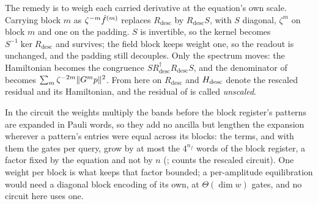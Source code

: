 The remedy is to weigh each carried derivative at the equation's own scale. Carrying block $m$ as $\zeta^{-m}\hat{f}^{(m)}$ replaces $R_{\mathrm{desc}}$ by $R_{\mathrm{desc}}S$, with $S$ diagonal, $\zeta^m$ on block $m$ and one on the padding. $S$ is invertible, so the kernel becomes $S^{-1}\ker R_{\mathrm{desc}}$ and  survives; the field block keeps weight one, so the readout is unchanged, and the padding still decouples. Only the spectrum moves: the Hamiltonian becomes the congruence $SR_{\mathrm{desc}}^\dagger R_{\mathrm{desc}}S$, and the denominator of  becomes $\sum_m\zeta^{-2m}\|G^mp\|^2$. From here on $R_{\mathrm{desc}}$ and $H_{\mathrm{desc}}$ denote the rescaled residual and its Hamiltonian, and the residual of  is called \emph{unscaled}.

In the circuit the weights multiply the bands before the block register's patterns are expanded in Pauli words, so they add no ancilla but lengthen the expansion wherever a pattern's entries were equal across its blocks: the terms, and with them the gates per query, grow by at most the $4^{n_f}$ words of the block register, a factor fixed by the equation and not by $n$ (;  counts the rescaled circuit). One weight per block is what keeps that factor bounded; a per-amplitude equilibration \cite{vandersluis1969} would need a diagonal block encoding of its own, at $\Theta(\dim w)$ gates, and no circuit here uses one.

